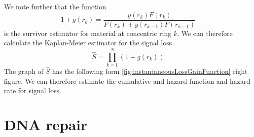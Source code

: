 \documentclass[12pt]{report}
\begin{document}
We note further that the function 
\begin{equation*}
1+g(r_k)= \frac{y(r_k)F(r_k)}{F(r_k)+y(r_{k-1})F(r_{k-1})}
\end{equation*}
is the survivor estimator for material at concentric ring $k$. We can therefore calculate the Kaplan-Meier estimator for the signal loss 
\begin{equation*}
\hat{S} = \prod_{k=1}^{N}(1+g(r_k))
\end{equation*}
The graph of $\hat{S}$ has the following form \ref{fig:instantaneousLossGainFunction} right figure. We can therefore estimate the cumulative and hazard function and hazard rate for signal loss. 




 
\section{DNA repair}
	
\end{document}
